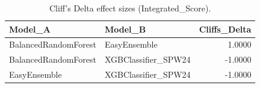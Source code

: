 \begin{table}[t]
\centering
\begin{tabular}{llr}
\toprule
Model_A & Model_B & Cliffs_Delta \\
\midrule
BalancedRandomForest & EasyEnsemble & 1.0000 \\
BalancedRandomForest & XGBClassifier_SPW24 & -1.0000 \\
EasyEnsemble & XGBClassifier_SPW24 & -1.0000 \\
\bottomrule
\end{tabular}
\caption{Cliff's Delta effect sizes (Integrated_Score).}
\label{tab:cliffs_Integrated_Score}
\end{table}